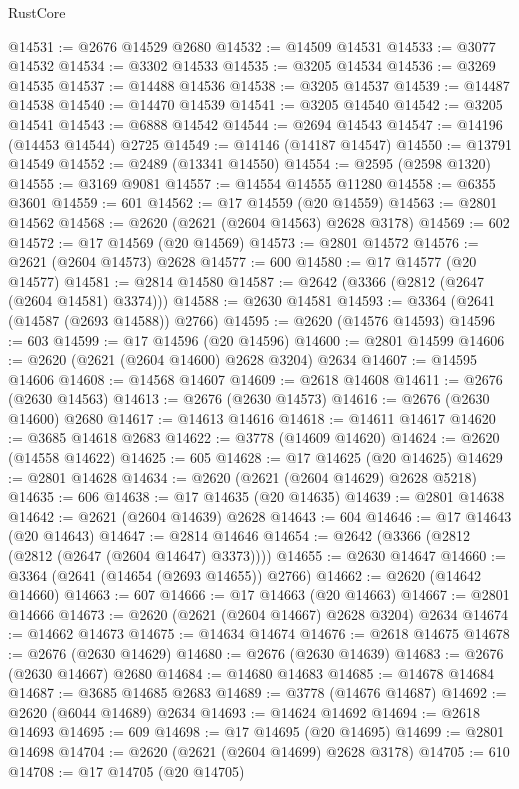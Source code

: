 \begin{lexlean}{RustCore}
\begin{coremodule}
@14531 := @2676 @14529 @2680
@14532 := @14509 @14531
@14533 := @3077 @14532
@14534 := @3302 @14533
@14535 := @3205 @14534
@14536 := @3269 @14535
@14537 := @14488 @14536
@14538 := @3205 @14537
@14539 := @14487 @14538
@14540 := @14470 @14539
@14541 := @3205 @14540
@14542 := @3205 @14541
@14543 := @6888 @14542
@14544 := @2694 @14543
@14547 := @14196 (@14453 @14544) @2725
@14549 := @14146 (@14187 @14547)
@14550 := @13791 @14549
@14552 := @2489 (@13341 @14550)
@14554 := @2595 (@2598 @1320)
@14555 := @3169 @9081
@14557 := @14554 @14555 @11280
@14558 := @6355 @3601
@14559 := 601
@14562 := @17 @14559 (@20 @14559)
@14563 := @2801 @14562
@14568 := @2620 (@2621 (@2604 @14563) @2628 @3178)
@14569 := 602
@14572 := @17 @14569 (@20 @14569)
@14573 := @2801 @14572
@14576 := @2621 (@2604 @14573) @2628
@14577 := 600
@14580 := @17 @14577 (@20 @14577)
@14581 := @2814 @14580
@14587 := @2642 (@3366 (@2812 (@2647 (@2604 @14581) @3374)))
@14588 := @2630 @14581
@14593 := @3364 (@2641 (@14587 (@2693 @14588)) @2766)
@14595 := @2620 (@14576 @14593)
@14596 := 603
@14599 := @17 @14596 (@20 @14596)
@14600 := @2801 @14599
@14606 := @2620 (@2621 (@2604 @14600) @2628 @3204) @2634
@14607 := @14595 @14606
@14608 := @14568 @14607
@14609 := @2618 @14608
@14611 := @2676 (@2630 @14563)
@14613 := @2676 (@2630 @14573)
@14616 := @2676 (@2630 @14600) @2680
@14617 := @14613 @14616
@14618 := @14611 @14617
@14620 := @3685 @14618 @2683
@14622 := @3778 (@14609 @14620)
@14624 := @2620 (@14558 @14622)
@14625 := 605
@14628 := @17 @14625 (@20 @14625)
@14629 := @2801 @14628
@14634 := @2620 (@2621 (@2604 @14629) @2628 @5218)
@14635 := 606
@14638 := @17 @14635 (@20 @14635)
@14639 := @2801 @14638
@14642 := @2621 (@2604 @14639) @2628
@14643 := 604
@14646 := @17 @14643 (@20 @14643)
@14647 := @2814 @14646
@14654 := @2642 (@3366 (@2812 (@2812 (@2647 (@2604 @14647) @3373))))
@14655 := @2630 @14647
@14660 := @3364 (@2641 (@14654 (@2693 @14655)) @2766)
@14662 := @2620 (@14642 @14660)
@14663 := 607
@14666 := @17 @14663 (@20 @14663)
@14667 := @2801 @14666
@14673 := @2620 (@2621 (@2604 @14667) @2628 @3204) @2634
@14674 := @14662 @14673
@14675 := @14634 @14674
@14676 := @2618 @14675
@14678 := @2676 (@2630 @14629)
@14680 := @2676 (@2630 @14639)
@14683 := @2676 (@2630 @14667) @2680
@14684 := @14680 @14683
@14685 := @14678 @14684
@14687 := @3685 @14685 @2683
@14689 := @3778 (@14676 @14687)
@14692 := @2620 (@6044 @14689) @2634
@14693 := @14624 @14692
@14694 := @2618 @14693
@14695 := 609
@14698 := @17 @14695 (@20 @14695)
@14699 := @2801 @14698
@14704 := @2620 (@2621 (@2604 @14699) @2628 @3178)
@14705 := 610
@14708 := @17 @14705 (@20 @14705)

\end{coremodule}
\end{lexlean}
